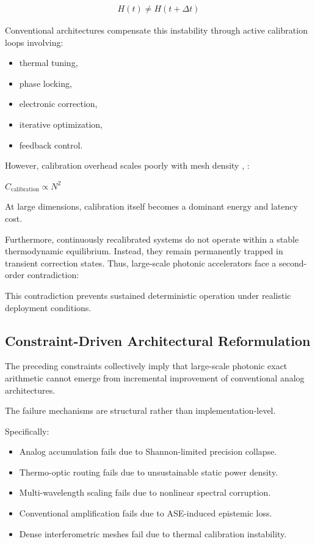 \documentclass[journal]{IEEEtran}
\begin{document}
\begin{align}
H(t) \neq H(t+\Delta t)
\label{eq:time_variation}
\end{align}

Conventional architectures compensate this instability through active calibration loops involving:

\begin{itemize}
\item thermal tuning,
\item phase locking,
\item electronic correction,
\item iterative optimization,
\item feedback control.
\end{itemize}

However, calibration overhead scales poorly with mesh density \cite{Miller2013}, \cite{Hamerly2022}:

$C_{\mathrm{calibration}} \propto N^2$

At large dimensions, calibration itself becomes a dominant energy and latency cost.

Furthermore, continuously recalibrated systems do not operate within a stable thermodynamic equilibrium. Instead, they remain permanently trapped in transient correction states. Thus, large-scale photonic accelerators face a second-order contradiction:



This contradiction prevents sustained deterministic operation under realistic deployment conditions.

\subsection{\textbf{Constraint-Driven Architectural Reformulation}}

The preceding constraints collectively imply that large-scale photonic exact arithmetic cannot emerge from incremental improvement of conventional analog architectures.

The failure mechanisms are structural rather than implementation-level.

Specifically:

\begin{itemize}
\item  Analog accumulation fails due to Shannon-limited precision collapse.
\item  Thermo-optic routing fails due to unsustainable static power density.
\item  Multi-wavelength scaling fails due to nonlinear spectral corruption.
\item  Conventional amplification fails due to ASE-induced epistemic loss.
\item  Dense interferometric meshes fail due to thermal calibration instability.
\end{itemize}
\end{document}
